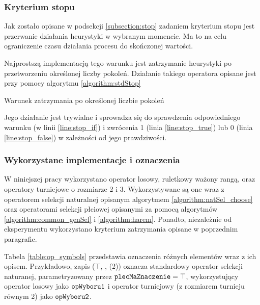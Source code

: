 \documentclass[./FM_mgr.tex]{subfiles}
\begin{document}
\subsubsection{Kryterium stopu}

Jak zostało opisane w podsekcji \ref{subsection:stop} zadaniem kryterium stopu jest przerwanie działania heurystyki w wybranym momencie.
Ma to na celu ograniczenie czasu działania procesu do skończonej wartości.

Najprostszą implementacją tego warunku jest zatrzymanie heurystyki po przetworzeniu określonej liczby pokoleń.
Działanie takiego operatora opisane jest przy pomocy algorytmu \ref{algorithm:stdStop}

\begin{algorithm}
	\caption{Warunek zatrzymania po określonej liczbie pokoleń \label{algorithm:stdStop}}
	\begin{algorithmic}[1]
		\Start
		\label{line:stop_if}
		\State {}
		\label{line:stop_true}
		\Else
		\State {}
		\label{line:stop_false}
		\EndIf
		\EndOperator
	\end{algorithmic}
\end{algorithm}

Jego działanie jest trywialne i sprowadza się do sprawdzenia odpowiedniego warunku (w linii \ref{line:stop_if}) i zwrócenia 1 (linia \ref{line:stop_true}) lub 0 (linia \ref{line:stop_false}) w zależności od jego prawdziwości.

\subsubsection{Wykorzystane implementacje i oznaczenia}

W niniejszej pracy wykorzystano operator losowy, ruletkowy ważony rangą, oraz operatory turniejowe o rozmiarze 2 i 3. 
Wykorzystywane są one wraz z operatorem selekcji naturalnej opisanym algorytmem \ref{algorithm:natSel_choose} oraz operatorami selekcji płciowej opisanymi za pomocą algorytmów \ref{algorithm:common_genSel} i \ref{algorithm:harem}.
Ponadto, niezależnie od eksperymentu wykorzystano kryterium zatrzymania opisane w poprzednim paragrafie. 

Tabela \ref{table:op_symbols} przedstawia oznaczenia różnych elementów wraz z ich opisem.
Przykładowo, zapis ($\top$, , (2)) oznacza standardowy operator selekcji naturanej, parametryzowany przez $\mathtt{plecMaZnaczenie}=\top$, wykorzystujący operator losowy jako $\mathtt{opWyboru1}$ i operator turniejowy (z rozmiarem turnieju równym 2) jako $\mathtt{opWyboru2}$.
\end{document}
